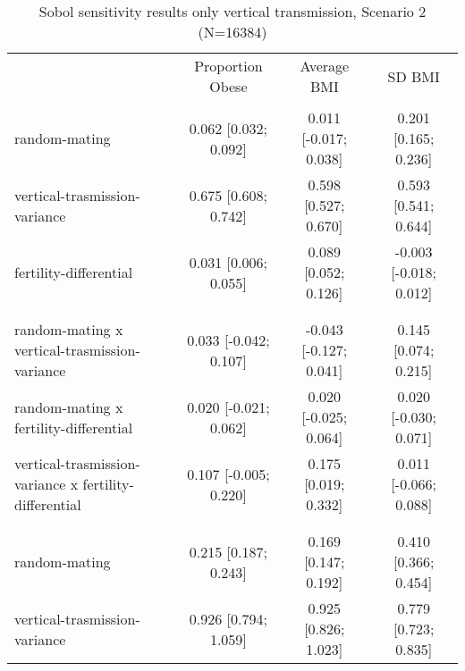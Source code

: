 
    \begin{table}[htp]
    \renewcommand{\arraystretch}{1.3}
    \setlength{\tabcolsep}{5pt}
    \caption{Sobol sensitivity results only vertical transmission, Scenario 2 (N=16384)}
    \label{tab:sobol-vt}
    \footnotesize
    \centering
    \begin{threeparttable}
    \begin{tabular}{lccc}
    \hline
    \addlinespace
    & Proportion Obese & Average BMI & SD BMI \\
    \addlinespace
    \hline
    \addlinespace[6pt]
    \multicolumn{4}{l}{\hspace{1em} S1} \\
\hspace{1.5em} random-mating & 0.062 [0.032; 0.092]   & 0.011 [-0.017; 0.038]   & 0.201 [0.165; 0.236] \\
	  \hspace{1.5em} vertical-trasmission-variance & 0.675 [0.608; 0.742]   & 0.598 [0.527; 0.670]   & 0.593 [0.541; 0.644] \\
	  \hspace{1.5em} fertility-differential & 0.031 [0.006; 0.055]   & 0.089 [0.052; 0.126]   & -0.003 [-0.018; 0.012] \\
	 \\
    \addlinespace[12pt]
    \multicolumn{4}{l}{\hspace{1em} S2} \\ 
\hspace{1.5em} random-mating x vertical-trasmission-variance & 0.033 [-0.042; 0.107]   & -0.043 [-0.127; 0.041]   & 0.145 [0.074; 0.215] \\
	  \hspace{1.5em} random-mating x fertility-differential & 0.020 [-0.021; 0.062]   & 0.020 [-0.025; 0.064]   & 0.020 [-0.030; 0.071] \\
	  \hspace{1.5em} vertical-trasmission-variance x fertility-differential & 0.107 [-0.005; 0.220]   & 0.175 [0.019; 0.332]   & 0.011 [-0.066; 0.088] \\
	 \\
    \addlinespace[12pt]
    \multicolumn{4}{l}{\hspace{1em} ST} \\ 
\hspace{1.5em} random-mating & 0.215 [0.187; 0.243]   & 0.169 [0.147; 0.192]   & 0.410 [0.366; 0.454] \\
	  \hspace{1.5em} vertical-trasmission-variance & 0.926 [0.794; 1.059]   & 0.925 [0.826; 1.023]   & 0.779 [0.723; 0.835] \\

\end{tabular}
\end{threeparttable}
\end{table}
